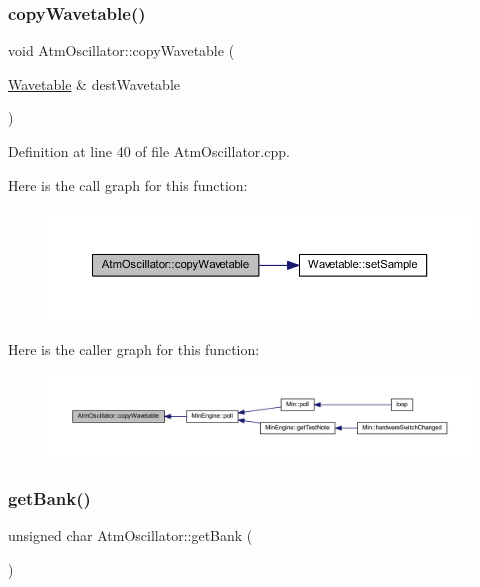 \subsubsection{\texorpdfstring{copy\+Wavetable()}{copyWavetable()}}
{\footnotesize\ttfamily void Atm\+Oscillator\+::copy\+Wavetable (\begin{DoxyParamCaption}\item[{\hyperlink{class_wavetable}{Wavetable} \&}]{dest\+Wavetable }\end{DoxyParamCaption})}



Definition at line 40 of file Atm\+Oscillator.\+cpp.

Here is the call graph for this function\+:
\nopagebreak
\begin{figure}[H]
\begin{center}
\leavevmode
\includegraphics[width=350pt]{class_atm_oscillator_ab0b1ab90e227ced30ddffff96bec6427_cgraph}
\end{center}
\end{figure}
Here is the caller graph for this function\+:
\nopagebreak
\begin{figure}[H]
\begin{center}
\leavevmode
\includegraphics[width=350pt]{class_atm_oscillator_ab0b1ab90e227ced30ddffff96bec6427_icgraph}
\end{center}
\end{figure}
\mbox{\label{class_atm_oscillator_a56b407e4175f4625e2e0d7a6f87c2225}} 
\subsubsection{\texorpdfstring{get\+Bank()}{getBank()}}
{\footnotesize\ttfamily unsigned char Atm\+Oscillator\+::get\+Bank (\begin{DoxyParamCaption}{ }\end{DoxyParamCaption})\hspace{0.3cm}{\ttfamily [inline]}}



